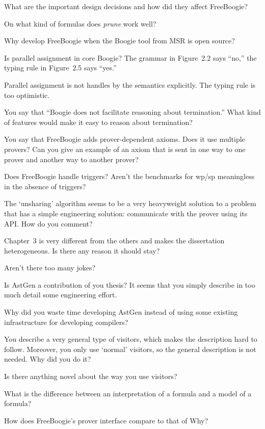 \Q What are the important design decisions and how did they affect
FreeBoogie?

\Q On what kind of formulas does {\it prune\/} work well?

\Q Why develop FreeBoogie when the Boogie tool from MSR is open source?

\Q Is parallel assignment in core Boogie? The grammar in Figure~2.2 says
``no,'' the typing rule in Figure~2.5 says ``yes.''

\A Parallel assignment is not handles by the semantics explicitly. The
typing rule is too optimistic.

\Q You say that ``Boogie does not facilitate reasoning about termination.''
What kind of features would make it easy to reason about termination?

\Q You say that FreeBoogie adds prover-dependent axioms. Does it use
multiple provers? Can you give an example of an axiom that is sent in one
way to one prover and another way to another prover?

\Q Does FreeBoogie handle triggers? Aren't the benchmarks for wp/sp
meaningless in the absence of triggers?

\Q The `unsharing' algorithm seems to be a very heavyweight solution to a
problem that has a simple engineering solution: communicate with the prover
using its API. How do you comment?

\Q Chapter~3 is very different from the others and makes the dissertation
heterogeneous. Is there any reason it should stay?

\Q Aren't there too many jokes?

\Q Is AstGen a contribution of you thesis? It seems that you simply
describe in too much detail some engineering effort.


\Q Why did you waste time developing AstGen instead of using some existing
infrastructure for developing compilers?

\Q You describe a very general type of visitors, which makes the
description hard to follow. Moreover, you only use `normal' visitors, so
the general description is not needed. Why did you do it?

\Q Is there anything novel about the way you use visitors?

\Q What is the difference between an interpretation of a formula and a
model of a formula?

\Q How does FreeBoogie's prover interface compare to that of Why?


